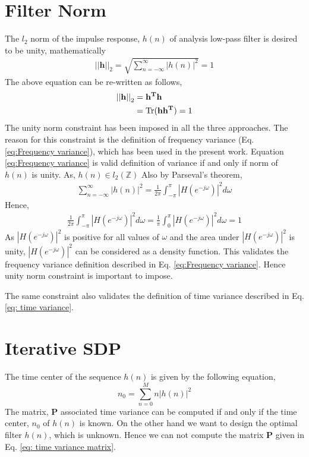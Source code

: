 \section{Filter Norm}
\label{sec: Filter Norm}
The $l_2$ norm of the impulse response, $h(n)$ of analysis low-pass filter is desired to be unity, mathematically 
\begin{eqnarray}
\label{eq: l2 norm}
 {||\mathbf{h}||}_2 = \sqrt{\sum_{n=-\infty}^{\infty}|h(n)|^2} = 1 
\end{eqnarray}
The above equation can be re-written as follows,
\begin{eqnarray}
\label{eq: l2 norm SDP form}
\begin{aligned}
{||\mathbf{h}||}_2 &= \mathbf{h^Th}\\ &= \operatorname{Tr}(\mathbf{hh^T}) = 1
\end{aligned}
\end{eqnarray}
The unity norm constraint has been imposed in all the three approaches. The reason for this constraint is the definition of frequency variance (Eq. \ref{eq:Frequency variance}), which has been used in the present work. Equation \ref{eq:Frequency variance} is valid definition of variance if and only if norm of $h(n)$ is unity. 
As, $h(n) \in l_2(\mathbb{Z})$
Also by Parseval's theorem,
\begin{eqnarray}
\label{eq: parsevals identity}
\sum_{n=-\infty}^{\infty}|h(n)|^2 = \frac{1}{2\pi}\int_{-\pi}^{\pi}|H(e^{-j\omega})|^2 d\omega
\end{eqnarray}
Hence,
\begin{eqnarray}
\frac{1}{2\pi}\int_{-\pi}^{\pi}|H(e^{-j\omega})|^2 d\omega = \frac{1}{\pi}\int_{0}^{\pi}|H(e^{-j\omega})|^2 d\omega = 1
\end{eqnarray}
As $|H(e^{-j\omega})|^2$ is positive for all values of $\omega$ and the area under $|H(e^{-j\omega})|^2$ is unity, $|H(e^{-j\omega})|^2$ can be considered as a density function. This validates the frequency variance definition described in Eq. \ref{eq:Frequency variance}. Hence unity norm constraint is important to impose.

The same constraint also validates the definition of time variance described in Eq. \ref{eq: time variance}.

\section{Iterative SDP}
\label{sec: Iterative SDP}
The time center of the sequence $h(n)$ is given by the following equation,
\begin{equation}
n_0 = \sum_{n=0}^{M} n |h(n)|^2
\end{equation} 
The matrix, $\mathbf{P}$ associated time variance can be computed if and only if the time center, $n_0$ of $h(n)$ is known. On the other hand we want to design the optimal filter $h(n)$, which is unknown. Hence we can not compute the matrix $\mathbf{P}$ given in Eq. \ref{eq: time variance matrix}. 

